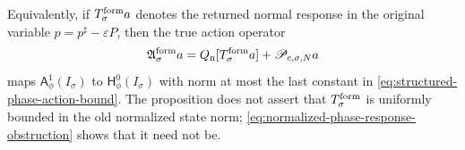 \begin{proposition}
Equivalently, if \(T_\sigma^{\rm form}a\) denotes the returned normal
response in the original variable
\(p=p^\sharp-\varepsilon P\), then the true action operator
\begin{equation}
 \mathfrak A_\sigma^{\rm form}a
 =Q_{\rm n}[T_\sigma^{\rm form}a]
       +\mathscr P_{c,\sigma,N}a                 \label{eq:formal-true-action-operator}
\end{equation}
maps \(\mathsf A_\phi^1(I_\sigma)\) to
\(\mathsf H_\phi^0(I_\sigma)\) with norm at most the last constant in
\cref{eq:structured-phase-action-bound}.  The proposition does not assert
that \(T_\sigma^{\rm form}\) is uniformly bounded in the old normalized
state norm; \cref{eq:normalized-phase-response-obstruction} shows that it
need not be.
\end{proposition}

